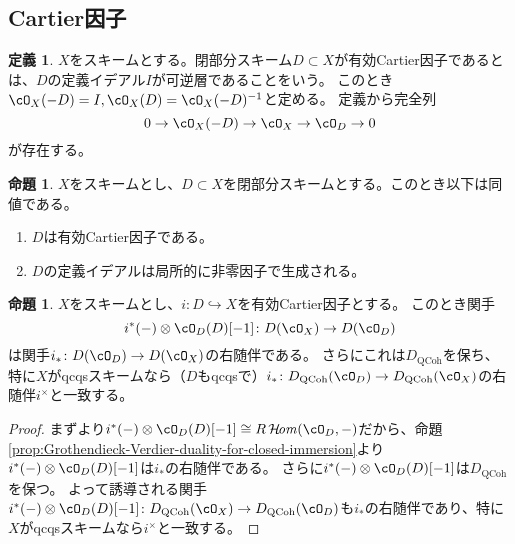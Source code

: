 \documentclass[uplatex, a4paper, dvipdfmx]{jsarticle}
\theoremstyle{definition}
\newtheorem{definition}[theorem]{定義}
\newtheorem{proposition}[theorem]{命題}
\DeclareMathOperator{\CHom}{\mathcal{H}\!\mathit{om}}
\DeclareMathOperator{\QCoh}{\mathrm{QCoh}}
\begin{document}
\subsection{Cartier因子}
\begin{definition}
    $X$をスキームとする。閉部分スキーム$D \subset X$が有効Cartier因子であるとは、$D$の定義イデアル$I$が可逆層であることをいう。
    このとき$\cO_X(-D) = I, \cO_X(D) = \cO_X(-D)^{-1}$と定める。
    定義から完全列
    \begin{equation}
        0 \to \cO_X(-D) \to \cO_X \to \cO_D \to 0
    \end{equation}
    が存在する。

\end{definition}
\begin{proposition}
    $X$をスキームとし、$D \subset X$を閉部分スキームとする。このとき以下は同値である。
    \begin{enumerate}
        \item $D$は有効Cartier因子である。
        \item $D$の定義イデアルは局所的に非零因子で生成される。
    \end{enumerate}
\end{proposition}
\begin{proposition}\label{prop:duality-for-Cartier-divisor}
    $X$をスキームとし、$i \colon D\hookrightarrow X$を有効Cartier因子とする。
    このとき関手
    \begin{equation}
        i^*(-)\otimes \cO_D(D)[-1] \colon D(\cO_X) \to D(\cO_D)
    \end{equation}
    は関手$i_* \colon D(\cO_D) \to D(\cO_X)$の右随伴である。
    さらにこれは$D_{\QCoh}$を保ち、
    特に$X$がqcqsスキームなら（$D$もqcqsで）$i_* \colon D_{\QCoh}(\cO_D) \to D_{\QCoh}(\cO_X)$の右随伴$i^\times$と一致する。
\end{proposition}
\begin{proof}
    まず{\cite[\href{https://stacks.math.columbia.edu/tag/0AA4}{Tag 0AA4}]{stacks-project}}より$i^*(-)\otimes \cO_D(D)[-1] \cong R\CHom(\cO_D, -)$だから、命題\ref{prop:Grothendieck-Verdier-duality-for-closed-immersion}より$i^*(-)\otimes \cO_D(D)[-1]$は$i_*$の右随伴である。
    さらに$i^*(-)\otimes \cO_D(D)[-1]$は$D_{\QCoh}$を保つ。
    よって誘導される関手$i^*(-)\otimes \cO_D(D)[-1] \colon D_{\QCoh}(\cO_X) \to D_{\QCoh}(\cO_D)$も$i_*$の右随伴であり、特に$X$がqcqsスキームなら$i^\times$と一致する。
\end{proof}
\end{document}
